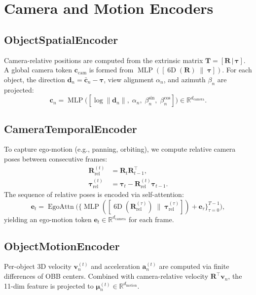 \documentclass{article}
\newcommand{\mR}{\mathbb{R}}
\newcommand{\op}[1]{\operatorname{#1}}
\newcommand{\mat}[1]{\bm{#1}}
\begin{document}
\section{Camera and Motion Encoders}
\label{sec:camera_motion}

\subsection{ObjectSpatialEncoder}
Camera-relative positions are computed from the extrinsic matrix $\mat{T} = [\mat{R}\,|\,\boldsymbol{\tau}]$. A global camera token $\mat{c}_{\text{cam}}$ is formed from $\op{MLP}([\op{6D}(\mat{R}) \;\|\; \boldsymbol{\tau}])$. For each object, the direction $\mat{d}_n = \bar{\mat{c}}_n - \boldsymbol{\tau}$, view alignment $\alpha_n$, and azimuth $\beta_n$ are projected:
\begin{equation}
    \mat{c}_n = \op{MLP}\bigl([\log\|\mat{d}_n\|,\;\alpha_n,\;\beta_n^{\sin},\;\beta_n^{\cos}]\bigr) \in \mR^{d_{\text{camera}}}.
    \label{eq:cam_per_obj}
\end{equation}

\subsection{CameraTemporalEncoder}
To capture ego-motion (e.g., panning, orbiting), we compute relative camera poses between consecutive frames:
\begin{align}
    \mat{R}_{\text{rel}}^{(t)} &= \mat{R}_t \mat{R}_{t-1}^{\!\top}, \label{eq:rel_rot} \\
    \boldsymbol{\tau}_{\text{rel}}^{(t)} &= \boldsymbol{\tau}_t - \mat{R}_{\text{rel}}^{(t)}\boldsymbol{\tau}_{t-1}. \label{eq:rel_trans}
\end{align}
The sequence of relative poses is encoded via self-attention:
\begin{equation}
    \mat{e}_t = \op{EgoAttn}\bigl(\{\op{MLP}([\op{6D}(\mat{R}_{\text{rel}}^{(\tau)}) \;\|\; \boldsymbol{\tau}_{\text{rel}}^{(\tau)}]) + \mat{e}_{\tau}\}_{\tau=0}^{T-1}\bigr),
    \label{eq:ego_motion}
\end{equation}
yielding an ego-motion token $\mat{e}_t \in \mR^{d_{\text{camera}}}$ for each frame.

\subsection{ObjectMotionEncoder}
Per-object 3D velocity $\mat{v}_n^{(t)}$ and acceleration $\mat{a}_n^{(t)}$ are computed via finite differences of OBB centers. Combined with camera-relative velocity $\mat{R}^{\!\top}\mat{v}_n$, the 11-dim feature is projected to $\mat{\mu}_n^{(t)} \in \mR^{d_{\text{motion}}}$.
\end{document}
